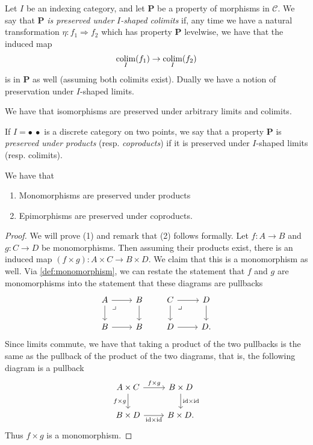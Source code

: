 \begin{definition}\label{def:colimit-preserve-property} Let $I$ be an indexing category, and let \textbf{P} be a property of morphisms in $\mathscr{C}$. We say that \textbf{P} \textit{is preserved under} $I$\textit{-shaped colimits} if, any time we have a natural transformation $\eta: f_1 \Rightarrow f_2$ which has property \textbf{P} levelwise, we have that the induced map
\begin{align*}
    \mathop{\operatorname*{colim}}_I(f_1) \to \mathop{\operatorname*{colim}}_I(f_2)
\end{align*}
is in \textbf{P} as well (assuming both colimits exist). Dually we have a notion of preservation under $I$-shaped limits.
\end{definition}

\begin{example} We have that isomorphisms are preserved under arbitrary limits and colimits.
\end{example}

\begin{example} If $I = \bullet\ \bullet$ is a discrete category on two points, we say that a property \textbf{P} is \textit{preserved under products} (resp. \textit{coproducts}) if it is preserved under $I$-shaped limits (resp. colimits).
\end{example}

\begin{proposition}\label{prop:monos-preserved-under-products} We have that
\begin{enumerate}
    \item Monomorphisms are preserved under products
    \item Epimorphisms are preserved under coproducts.
\end{enumerate}
\end{proposition}
\begin{proof} We will prove (1) and remark that (2) follows formally. Let $f: A \to B$ and $g: C \to D$ be monomorphisms. Then assuming their products exist, there is an induced map $(f \times g) : A \times C \to B \times D$. We claim that this is a monomorphism as well. Via \autoref{def:monomorphism}, we can restate the statement that $f$ and $g$ are monomorphisms into the statement that these diagrams are pullbacks
\[ \begin{tikzcd}
    A\rar\dar\pb & B\dar\\
    B\rar & B
\end{tikzcd} \quad\quad  \begin{tikzcd}
    C\rar\dar\pb & D\dar\\
    D\rar & D.
\end{tikzcd} \]
Since limits commute, we have that taking a product of the two pullbacks is the same as the pullback of the product of the two diagrams, that is, the following diagram is a pullback
\[ \begin{tikzcd}
    A \times C\rar["f \times g"]\dar["f \times g" left] & B \times D\dar["\id \times \id" right]\\
    B \times D \rar["\id \times \id" below] & B \times D.
\end{tikzcd} \]
Thus $f \times g$ is a monomorphism.
\end{proof}


